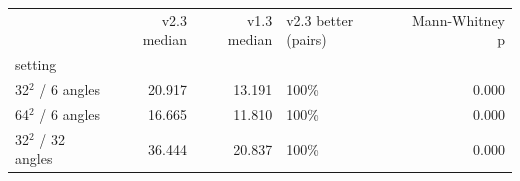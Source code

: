 \begin{tabular}{lrrlr}
\toprule
 & v2.3 median & v1.3 median & v2.3 better (pairs) & Mann-Whitney p \\
setting &  &  &  &  \\
\midrule
32$^2$ / 6 angles & 20.917 & 13.191 & 100\% & 0.000 \\
64$^2$ / 6 angles & 16.665 & 11.810 & 100\% & 0.000 \\
32$^2$ / 32 angles & 36.444 & 20.837 & 100\% & 0.000 \\
\bottomrule
\end{tabular}

